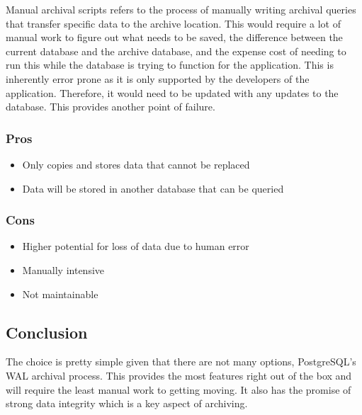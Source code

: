 \documentclass[draftclsnofoot,onecolumn,journal,letterpaper,compsoc,10pt]{IEEEtran}
\begin{document}
        Manual archival scripts refers to the process of manually writing archival queries that transfer specific data to the archive location.  This would require a lot of manual work to figure out what needs to be saved, the difference between the current database and the archive database, and the expense cost of needing to run this while the database is trying to function for the application.  This is inherently error prone as it is only supported by the developers of the application.  Therefore, it would need to be updated with any updates to the database.  This provides another point of failure.
        
        \subsubsection{Pros}
        \begin{itemize}
            \item Only copies and stores data that cannot be replaced
            \item Data will be stored in another database that can be queried
        \end{itemize}
        
        \subsubsection{Cons}
        \begin{itemize}
            \item Higher potential for loss of data due to human error
            \item Manually intensive
            \item Not maintainable
        \end{itemize}
    
    \subsection{Conclusion}
    
    The choice is pretty simple given that there are not many options, PostgreSQL's WAL archival process.  This provides the most features right out of the box and will require the least manual work to getting moving.  It also has the promise of strong data integrity which is a key aspect of archiving.



\end{document}
